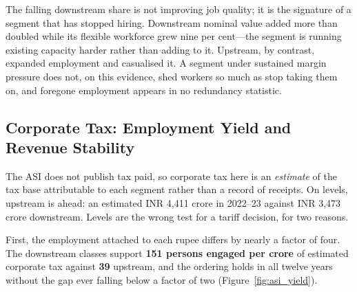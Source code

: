 The falling downstream share is not improving job quality; it is the signature of a segment that has stopped hiring. Downstream nominal value added more than doubled while its flexible workforce grew nine per cent---the segment is running existing capacity harder rather than adding to it. Upstream, by contrast, expanded employment and casualised it. A segment under sustained margin pressure does not, on this evidence, shed workers so much as stop taking them on, and foregone employment appears in no redundancy statistic.

\subsection{Corporate Tax: Employment Yield and Revenue Stability}

The ASI does not publish tax paid, so corporate tax here is an \emph{estimate} of the tax base attributable to each segment rather than a record of receipts. On levels, upstream is ahead: an estimated INR 4,411 crore in 2022--23 against INR 3,473 crore downstream. Levels are the wrong test for a tariff decision, for two reasons.

First, the employment attached to each rupee differs by nearly a factor of four. The downstream classes support \textbf{151 persons engaged per crore} of estimated corporate tax against \textbf{39} upstream, and the ordering holds in all twelve years without the gap ever falling below a factor of two (Figure~\ref{fig:asi_yield}).

